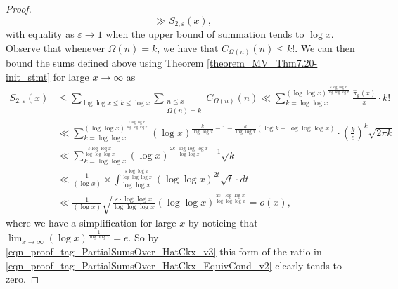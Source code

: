\documentclass[11pt,reqno,a4letter]{article}
\numberwithin{figure}{section}
\numberwithin{table}{section}
\theoremstyle{plain}
\numberwithin{theorem}{section}
\theoremstyle{definition}
\begin{document}
\begin{proof}
\[     \gg S_{2,\varepsilon}(x),  
\]
with equality as $\varepsilon \rightarrow 1$ when the upper bound of summation tends to $\log x$. 
Observe that whenever $\Omega(n) = k$, we have that $C_{\Omega(n)}(n) \leq k!$. 
We can then bound the sums defined above using 
Theorem \ref{theorem_MV_Thm7.20-init_stmt} for large $x \rightarrow \infty$ as 
\begin{align*} 
S_{2,\varepsilon}(x) & \leq 
     \sum_{\log\log x \leq k \leq \log x} \sum_{\substack{n \leq x \\ \Omega(n)=k}} C_{\Omega(n)}(n) 
     \ll \sum_{k=\log\log x}^{(\log\log x)^{\frac{\varepsilon \log\log x}{\log\log\log x}}} 
      \frac{\widehat{\pi}_k(x)}{x} \cdot k! \\ 
     & \ll \sum_{k=\log\log x}^{(\log\log x)^{\frac{\varepsilon \log\log x}{\log\log\log x}}} 
     (\log x)^{\frac{k}{\log\log x} - 1 - \frac{k}{\log\log x} \left( 
     \log k - \log\log\log x\right)} \cdot \left(\frac{k}{e}\right)^{k} \sqrt{2\pi k} \\ 
     & \ll \sum_{k=\log\log x}^{\frac{\varepsilon \log\log x}{\log\log\log x}} 
     (\log x)^{\frac{2k \cdot \log\log\log x}{\log\log x} - 1} \sqrt{k} \\ 
     & \ll \frac{1}{(\log x)} \times \int_{\log\log x}^{ 
     \frac{\varepsilon \log\log x}{\log\log\log x}} (\log\log x)^{2t} \sqrt{t} \cdot dt \\ 
     & \ll \frac{1}{(\log x)} \sqrt{\frac{\varepsilon \cdot \log\log x}{\log\log\log x}} 
     (\log\log x)^{\frac{2\varepsilon \cdot \log\log x}{\log\log\log x}} = o(x), 
\end{align*} 
where we have a simplification for large $x$ by noticing that 
$\lim_{x \rightarrow \infty} (\log x)^{\frac{1}{\log\log x}} = e$. 
So by \eqref{eqn_proof_tag_PartialSumsOver_HatCkx_v3} this 
form of the ratio in \eqref{eqn_proof_tag_PartialSumsOver_HatCkx_EquivCond_v2} clearly tends to zero. 
\end{proof} 
\end{document}
